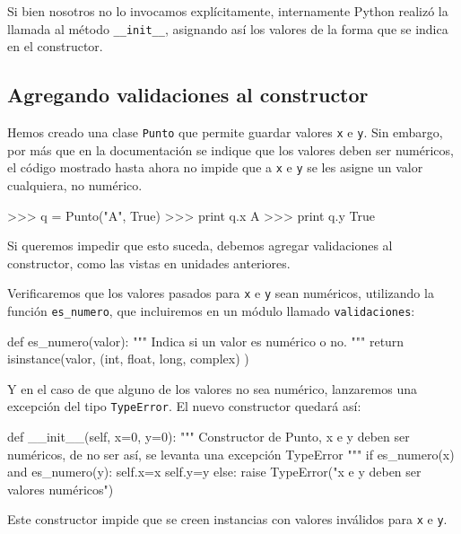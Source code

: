 Si bien nosotros no lo invocamos explícitamente, internamente Python
realizó la llamada al método \lstinline!__init__!, asignando así los
valores de la forma que se indica en el constructor.

\subsection{Agregando validaciones al constructor}

Hemos creado una clase \lstinline!Punto! que permite guardar valores
\lstinline!x! e \lstinline!y!.  Sin embargo, por más que en la
documentación se indique que los valores deben ser numéricos, el código
mostrado hasta ahora no impide que a \lstinline!x! e \lstinline!y! se les
asigne un valor cualquiera, no numérico.

\begin{codigo-python-sn}
>>> q = Punto("A", True)
>>> print q.x
A
>>> print q.y
True
\end{codigo-python-sn}

Si queremos impedir que esto suceda, debemos agregar validaciones al
constructor, como las vistas en unidades anteriores.

Verificaremos que los valores pasados para \lstinline!x! e \lstinline!y!
sean numéricos, utilizando la función \lstinline!es_numero!, que
incluiremos en un módulo llamado \lstinline!validaciones!:

\begin{codigo-python-sn}
def es_numero(valor):
    """ Indica si un valor es numérico o no. """
    return isinstance(valor, (int, float, long, complex) )
\end{codigo-python-sn}

Y en el caso de que alguno de los valores no sea numérico, lanzaremos una
excepción del tipo \lstinline!TypeError!.  El nuevo constructor quedará
así:

\begin{codigo-python-sn}
    def __init__(self, x=0, y=0):
        """ Constructor de Punto, x e y deben ser numéricos,
            de no ser así, se levanta una excepción TypeError """
        if es_numero(x) and es_numero(y):
            self.x=x
            self.y=y
        else:
            raise TypeError("x e y deben ser valores numéricos")
\end{codigo-python-sn}

Este constructor impide que se creen instancias con valores inválidos para
\lstinline!x! e \lstinline!y!.

